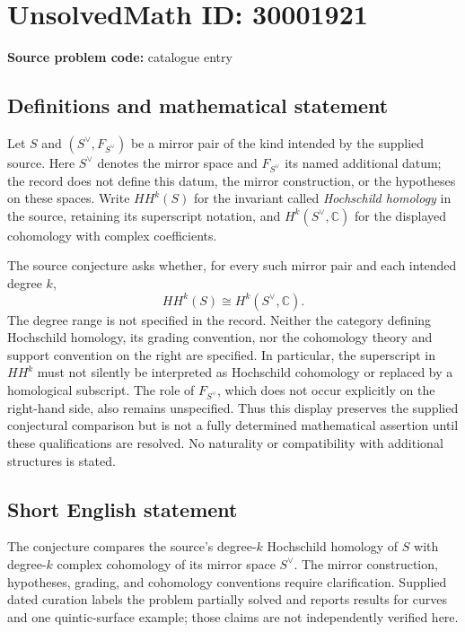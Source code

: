 \documentclass[11pt]{article}
\newcommand{\C}{\mathbb{C}}
\begin{document}
\section*{UnsolvedMath ID: 30001921}
\textbf{Source problem code:} catalogue entry
\subsection{Definitions and mathematical statement}
Let \(S\) and \((S^\vee,F_{S^\vee})\) be a mirror pair of the kind intended by the supplied source. Here \(S^\vee\) denotes the mirror space and \(F_{S^\vee}\) its named additional datum; the record does not define this datum, the mirror construction, or the hypotheses on these spaces. Write \(HH^k(S)\) for the invariant called \emph{Hochschild homology} in the source, retaining its superscript notation, and \(H^k(S^\vee,\C)\) for the displayed cohomology with complex coefficients.

The source conjecture asks whether, for every such mirror pair and each intended degree \(k\),
\[
HH^k(S)\cong H^k(S^\vee,\C).
\]
The degree range is not specified in the record. Neither the category defining Hochschild homology, its grading convention, nor the cohomology theory and support convention on the right are specified. In particular, the superscript in \(HH^k\) must not silently be interpreted as Hochschild cohomology or replaced by a homological subscript. The role of \(F_{S^\vee}\), which does not occur explicitly on the right-hand side, also remains unspecified. Thus this display preserves the supplied conjectural comparison but is not a fully determined mathematical assertion until these qualifications are resolved. No naturality or compatibility with additional structures is stated.
\subsection{Short English statement}
The conjecture compares the source's degree-\(k\) Hochschild homology of \(S\) with degree-\(k\) complex cohomology of its mirror space \(S^\vee\). The mirror construction, hypotheses, grading, and cohomology conventions require clarification. Supplied dated curation labels the problem partially solved and reports results for curves and one quintic-surface example; those claims are not independently verified here.
\end{document}
